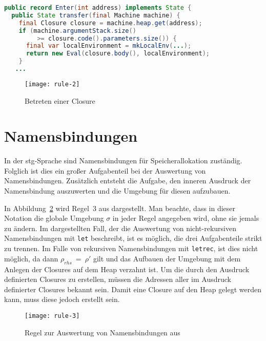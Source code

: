 \begin{lstlisting}[language=java,morekeywords={record}, caption={Implementierung des Betretens einer Closure}]
public record Enter(int address) implements State {
  public State transfer(final Machine machine) {
    final Closure closure = machine.heap.get(address);
    if (machine.argumentStack.size()
         >= closure.code().parameters.size()) {
      final var localEnvironment = mkLocalEnv(...);
      return new Eval(closure.body(), localEnvironment);
    }
   ...
\end{lstlisting}

\begin{figure}[h]
  \centering
  \texttt{[image: rule-2]}
  \caption{Betreten einer Closure}\label{fig:rule-2}
\end{figure}

\section{Namensbindungen}\label{sec:namensbindungen}

In der \gls{stg}-Sprache sind Namensbindungen für Speicherallokation zuständig.
Folglich ist dies ein großer Aufgabenteil bei der Auswertung von Namensbindungen.
Zusätzlich entsteht die Aufgabe, den inneren Ausdruck der Namensbindung auszuwerten und die Umgebung für diesen aufzubauen.

In Abbildung~\ref{fig:stg-rule3} wird Regel~3 aus  dargestellt.
Man beachte, dass in dieser Notation die globale Umgebung $\sigma$ in jeder Regel angegeben wird, ohne sie jemals zu ändern.
Im dargestellten Fall, der die Auswertung von nicht-rekursiven Namensbindungen mit \texttt{let} beschreibt, ist es möglich, die drei Aufgabenteile strikt zu trennen.
Im Falle von rekursiven Namensbindungen mit \texttt{letrec}, ist dies nicht möglich, da dann $\rho_{rhs}\ =\ \rho'$ gilt und das Aufbauen der Umgebung mit dem Anlegen der Closures auf dem Heap verzahnt ist.
Um die durch den Ausdruck definierten Closures zu erstellen, müssen die Adressen aller im Ausdruck definierter Closures bekannt sein.
Damit eine Closure auf den Heap gelegt werden kann, muss diese jedoch erstellt sein.

\begin{figure}[h]
  \centering
  \texttt{[image: rule-3]}
  \caption{Regel zur Auswertung von Namensbindungen aus }\label{fig:stg-rule3}
\end{figure}


